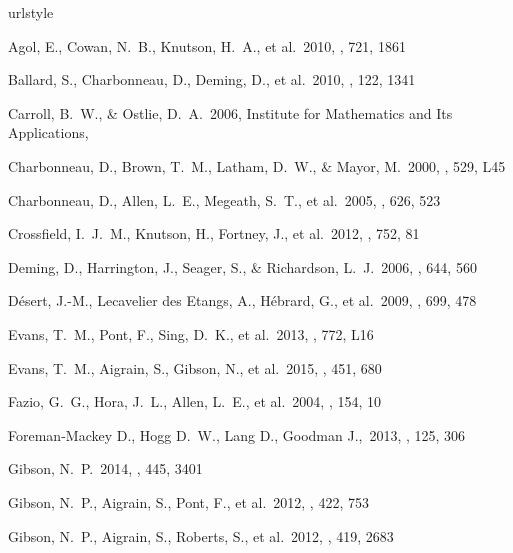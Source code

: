 \begin{thebibliography}{25}
\providecommand{\natexlab}[1]{#1}
\providecommand{\url}[1]{\texttt{#1}}
\expandafter\ifx\csname urlstyle\endcsname\relax
  \providecommand{\doi}[1]{doi: #1}\else
  \providecommand{\doi}{doi: \begingroup \urlstyle{rm}\Url}\fi

 Agol, E., Cowan, N.~B., Knutson, H.~A., et al.\ 2010, \apj, 721, 1861

 Ballard, S., Charbonneau, D., Deming, D., et al.\ 2010, \pasp, 122, 1341

 Carroll, B.~W., \& Ostlie, D.~A.\ 2006, Institute for Mathematics and Its Applications,

 Charbonneau, D., Brown, T.~M., Latham, D.~W., \& Mayor, M.\ 2000, \apjl, 529, L45

 Charbonneau, D., Allen, L.~E., Megeath, S.~T., et al.\ 2005, \apj, 626, 523

 Crossfield, I.~J.~M., Knutson, H., Fortney, J., et al.\ 2012, \apj, 752, 81

 Deming, D., Harrington, J., Seager, S., \& Richardson, L.~J.\ 2006, \apj, 644, 560

 D{\'e}sert, J.-M., Lecavelier des Etangs, A., H{\'e}brard, G., et al.\ 2009, \apj, 699, 478

 Evans, T.~M., Pont, F., Sing, D.~K., et al.\ 2013, \apjl, 772, L16

 Evans, T.~M., Aigrain, S., Gibson, N., et al.\ 2015, \mnras, 451, 680

 Fazio, G.~G., Hora, J.~L., Allen, L.~E., et al.\ 2004, \apjs, 154, 10

 Foreman-Mackey D., Hogg D.~W., Lang D., Goodman J.,\ 2013, \pasp, 125, 306

 Gibson, N.~P.\ 2014, \mnras, 445, 3401

\bibitem[Gibson et al.(2012{\natexlab{a}})]{gibson2012a} Gibson, N.~P., Aigrain, S., Pont, F., et al.\ 2012, \mnras, 422, 753

\bibitem[Gibson et al.(2012{\natexlab{b}})]{gibson2012b} Gibson, N.~P., Aigrain, S., Roberts, S., et al.\ 2012, \mnras, 419, 2683


\end{thebibliography}
